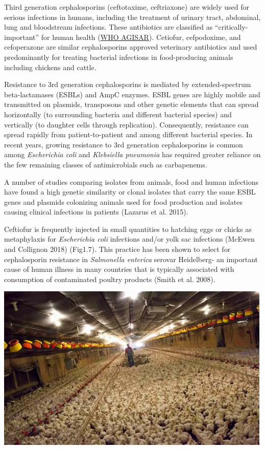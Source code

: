 \documentclass[]{tufte-handout}
\begin{document}
Third generation cephalosporins (ceftotaxime, ceftriaxone) are widely
used for serious infections in humans, including the treatment of
urinary tract, abdominal, lung and bloodstream infections. These
antibiotics are classified as ``critically-important'' for human health
(\href{http://www.agisar.org/}{WHO AGISAR}). Cetiofur, cefpodoxime, and
cefoperazone are similar cephalosporins approved veterinary antibiotics
and used predominantly for treating bacterial infections in
food-producing animals including chickens and cattle.

Resistance to 3rd generation cephalosporins is mediated by
extended-spectrum beta-lactamases (ESBLs) and AmpC enzymes. ESBL genes
are highly mobile and transmitted on plasmids, transposons and other
genetic elements that can spread horizontally (to surrounding bacteria
and different bacterial species) and vertically (to daughter cells
through replication). Consequently, resistance can spread rapidly from
patient-to-patient and among different bacterial species. In recent
years, growing resistance to 3rd generation cephalosporins is common
among \emph{Escherichia coli} and \emph{Klebsiella pneumonia} has
required greater reliance on the few remaining classes of antimicrobials
such as carbapenems.

A number of studies comparing isolates from animals, food and human
infections have found a high genetic similarity or clonal isolates that
carry the same ESBL genes and plasmids colonizing animals used for food
production and isolates causing clinical infections in patients (Lazarus
et al. 2015).

Ceftiofur is frequently injected in small quantities to hatching eggs or
chicks as metaphylaxis for \emph{Escherichia coli} infections and/or
yolk sac infections (McEwen and Collignon 2018) (Fig1.7). This practice
has been shown to select for cephalosporin resistance in
\emph{Salmonella enterica} serovar Heidelberg- an important cause of
human illness in many countries that is typically associated with
consumption of contaminated poultry products (Smith et al. 2008).

\includegraphics[width=5.20833in,height=\textheight]{images/chicken_farm.png}
\end{document}
